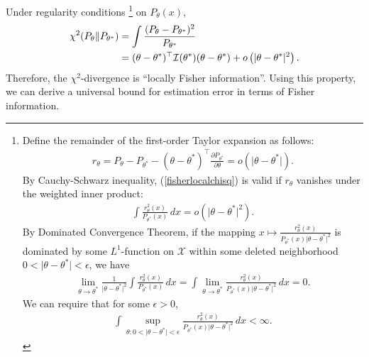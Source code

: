 \documentclass{article}
\numberwithin{equation}{section}
\renewcommand{\cal}{\mathcal}
\theoremstyle{plain}
\theoremstyle{definition}
\begin{document}
Under regularity conditions \footnote{
Define the remainder of the first-order Taylor expansion as follows:
\begin{align*}
	r_\theta=P_\theta-P_{\theta^*}-(\theta-\theta^*)^\top\frac{\partial P_{\theta^*}}{\partial\theta}=o(\vert\theta-\theta^*\vert).
\end{align*}
By Cauchy-Schwarz inequality, (\ref{fisherlocalchisq}) is valid if $r_\theta$ vanishes under the weighted inner product:
\begin{align*}
\int\frac{r_\theta^2(x)}{P_{\theta^*}(x)}\,dx=o(\vert\theta-\theta^*\vert^2).
\end{align*}
By Dominated Convergence Theorem, if the mapping $x\mapsto \frac{r_\theta^2(x)}{P_{\theta^*}(x)\vert\theta-\theta^*\vert^2}$ is dominated by some $L^1$-function on $\cal{X}$ within some deleted neighborhood $0<\vert\theta-\theta^*\vert<\epsilon$, we have
\begin{align*}
	\lim_{\theta\to\theta^*}\frac{1}{\vert\theta-\theta^*\vert^2}\int\frac{r_\theta^2(x)}{P_{\theta^*}(x)}\,dx=\int\lim_{\theta\to\theta^*}\frac{r_\theta^2(x)}{P_{\theta^*}(x)\vert\theta-\theta^*\vert^2}\,dx=0.
\end{align*} 
We can require that for some $\epsilon>0$,
\begin{align*}
	\int\sup_{\theta:0<\vert\theta-\theta^*\vert<\epsilon}\frac{r_\theta^2(x)}{P_{\theta^*}(x)\vert\theta-\theta^*\vert^2}\,dx<\infty.
\end{align*}}
on $P_\theta(x)$, 
\begin{align}
	\chi^2(P_\theta\Vert P_{\theta^*})&=\int\frac{(P_\theta-P_{\theta^*})^2}{P_{\theta^*}}\notag\\
	&=(\theta-\theta^*)^\top\cal{I}(\theta^*)(\theta-\theta^*)+o\left(\vert\theta-\theta^*\vert^2\right).\label{fisherlocalchisq}
\end{align}
Therefore, the $\chi^2$-divergence is ``locally Fisher information''. Using this property, we can derive a universal bound for estimation error in terms of Fisher information.
\end{document}
